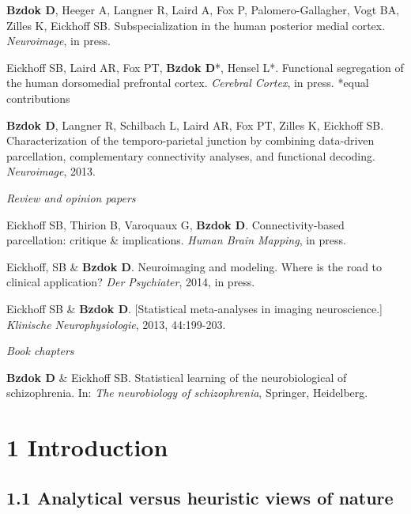 \documentclass[authoryear,review,3p]{elsarticle}
\begin{document}
\textbf{Bzdok D}, Heeger A, Langner R, Laird A, Fox P, Palomero-Gallagher,
Vogt BA, Zilles K, Eickhoff SB.
Subspecialization in the human posterior medial cortex.
\textit{Neuroimage}, in press.

Eickhoff SB, Laird AR, Fox PT, \textbf{Bzdok D}*, Hensel L*.
Functional segregation of the human dorsomedial prefrontal cortex.
\textit{Cerebral Cortex}, in press. *equal contributions

\textbf{Bzdok D}, Langner R, Schilbach L, Laird AR, Fox PT, Zilles K, Eickhoff SB.
Characterization of the temporo-parietal junction by combining data-driven
parcellation, complementary connectivity analyses, and functional decoding.
\textit{Neuroimage}, 2013.

\bigskip
\textit{Review and opinion papers}

Eickhoff SB, Thirion B, Varoquaux G, \textbf{Bzdok D}.
Connectivity-based parcellation: critique \& implications.
\textit{Human Brain Mapping}, in press.

Eickhoff, SB \& \textbf{Bzdok D}.
Neuroimaging and modeling. Where is the road to clinical application?
\textit{Der Psychiater}, 2014, in press. 

Eickhoff SB \& \textbf{Bzdok D}.
[Statistical meta-analyses in imaging neuroscience.]
\textit{Klinische Neurophysiologie}, 2013, 44:199-203.

\bigskip
\textit{Book chapters}

\linebreak
\textbf{Bzdok D} \& Eickhoff SB.
Statistical learning of the neurobiological of schizophrenia.
In: \textit{The neurobiology of schizophrenia}, Springer, Heidelberg.

\newpage

\section*{1 Introduction}

\subsection*{1.1 Analytical versus heuristic views of nature}
\end{document}
